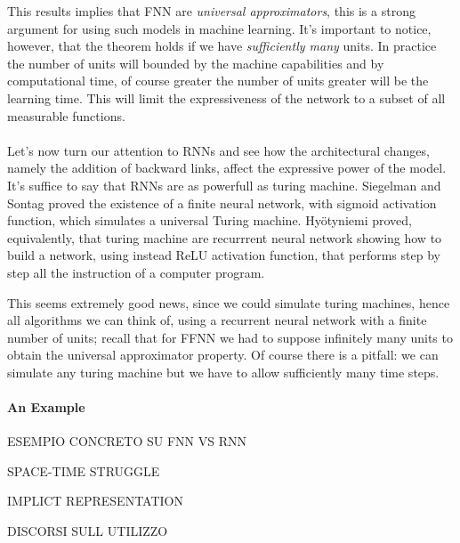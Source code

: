 This results implies that FNN are \textit{universal approximators}, this is a strong argument for using such models in machine learning.
It's important to notice, however, that the theorem holds if we have \textit{sufficiently many} units. In practice the number of units will bounded
by the machine capabilities and by computational time, of course greater the number of units greater will be the learning time. This will limit
the expressiveness of the network to a subset of all measurable functions. 
\\\\Let's now turn our attention to RNNs and see how the architectural changes, namely the addition of backward links, affect the expressive power of the model.
It's suffice to say that RNNs are as powerfull as turing machine. Siegelman and Sontag \cite{Siegelmann91turingcomputability} proved the existence 
of a finite neural network, with sigmoid activation function, which simulates a universal Turing machine. Hy{\"o}tyniemi \cite{Hyotyniemi96turingmachines} proved, equivalently,
that turing machine are recurrrent neural network showing how to build a network, using instead ReLU activation function, that performs step by step 
all the instruction of a computer program.

This seems extremely good news, since we could simulate turing machines, hence all algorithms we can think of, using a recurrent neural network with a finite
number of units; recall that for FFNN we had to suppose infinitely many units to obtain the universal approximator property.
Of course there is a pitfall: we can simulate any turing machine but we have to allow sufficiently many time steps.


\paragraph{An Example}
ESEMPIO CONCRETO SU FNN VS RNN

SPACE-TIME STRUGGLE

IMPLICT REPRESENTATION

DISCORSI SULL UTILIZZO





